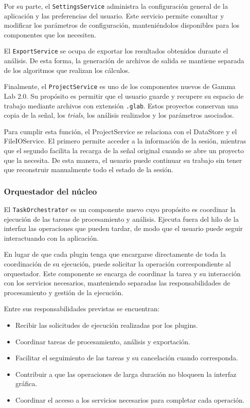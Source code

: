 \documentclass[11pt,a4paper]{article}
\DeclareRobustCommand{\_}{\textunderscore\allowbreak}
\begin{document}
Por su parte, el \texttt{SettingsService} administra la configuración general de la aplicación y las preferencias del usuario. Este servicio permite consultar y modificar los parámetros de configuración, manteniéndolos disponibles para los componentes que los necesiten.

El \texttt{ExportService} se ocupa de exportar los resultados obtenidos durante el análisis. De esta forma, la generación de archivos de salida se mantiene separada de los algoritmos que realizan los cálculos.

Finalmente, el \texttt{ProjectService} es uno de los componentes nuevos de Gamma Lab 2.0. Su propósito es permitir que el usuario guarde y recupere su espacio de trabajo mediante archivos con extensión \texttt{.glab}. Estos proyectos conservan una copia de la señal, los \textit{trials}, los análisis realizados y los parámetros asociados.

Para cumplir esta función, el ProjectService se relaciona con el DataStore y el FileIOService. El primero permite acceder a la información de la sesión, mientras que el segundo facilita la recarga de la señal original cuando se abre un proyecto que la necesita. De esta manera, el usuario puede continuar su trabajo sin tener que reconstruir manualmente todo el estado de la sesión.

\subsubsection{Orquestador del núcleo}

El \texttt{TaskOrchestrator} es un componente nuevo cuyo propósito es coordinar la ejecución de las tareas de procesamiento y análisis. Ejecuta fuera del hilo de la interfaz las operaciones que pueden tardar, de modo que el usuario puede seguir interactuando con la aplicación.

En lugar de que cada plugin tenga que encargarse directamente de toda la coordinación de su ejecución, puede solicitar la operación correspondiente al orquestador. Este componente se encarga de coordinar la tarea y su interacción con los servicios necesarios, manteniendo separadas las responsabilidades de procesamiento y gestión de la ejecución.

Entre sus responsabilidades previstas se encuentran:

\begin{itemize}
    \item Recibir las solicitudes de ejecución realizadas por los plugins.
    \item Coordinar tareas de procesamiento, análisis y exportación.
    \item Facilitar el seguimiento de las tareas y su cancelación cuando corresponda.
    \item Contribuir a que las operaciones de larga duración no bloqueen la interfaz gráfica.
    \item Coordinar el acceso a los servicios necesarios para completar cada operación.
\end{itemize}
\end{document}
